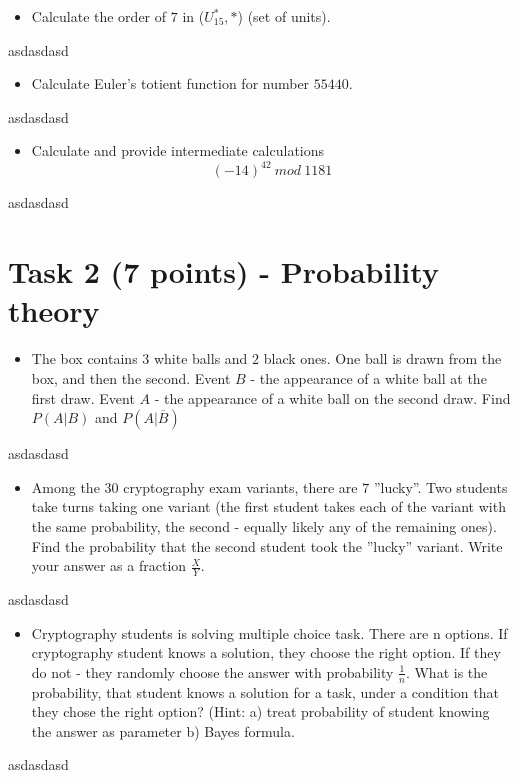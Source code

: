 \documentclass{article}
\begin{document}
\begin{itemize}
    \item Calculate the order of $7$ in ($U^{\text{*}}_{15}, \text{*}$) (set of units).
\end{itemize}
asdasdasd

\begin{itemize}
    \item Calculate Euler’s totient function for number $55440$.
\end{itemize}
asdasdasd


\begin{itemize}
    \item Calculate and provide intermediate calculations $$(-14)^{42}~mod~1181$$ 
\end{itemize}
asdasdasd



\section*{Task 2 (7 points) - Probability theory} %
\begin{itemize}
    \item The box contains $3$ white balls and $2$ black ones. One ball is drawn from the box, and then the second. Event $B$ - the 
    appearance of a white ball at the first draw. Event $A$ - the appearance of a white ball on the second draw. Find $P(A|B)$ and $P(A|\overline{B})$
\end{itemize}
asdasdasd

\begin{itemize}
    \item Among the $30$ cryptography exam variants, there are $7$ ”lucky”. Two students take turns taking one variant 
    (the first student takes each of the variant with the same probability, the second - equally likely any of the remaining ones). 
    Find the probability that the second student took the ”lucky” variant. Write your answer as a fraction $\frac{X}{Y}$.
\end{itemize}
asdasdasd

\begin{itemize}
    \item Cryptography students is solving multiple choice task. There are n options. 
    If cryptography student knows a solution, they choose the right option. 
    If they do not - they randomly choose the answer with probability $\frac{1}{n}$. 
    What is the probability, that student knows a solution for a task, under a condition that they chose the right option? 
    (Hint: a) treat probability of student knowing the answer as parameter b) Bayes formula.
\end{itemize}
asdasdasd
\end{document}
